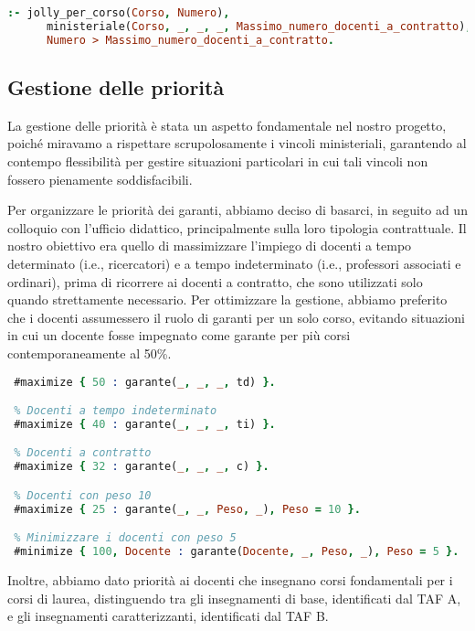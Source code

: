 \begin{lstlisting}[language=prolog, caption={Vincolo sul numero massimo di docenti a contratto.}]
 :- jolly_per_corso(Corso, Numero),
      ministeriale(Corso, _, _, _, Massimo_numero_docenti_a_contratto),
      Numero > Massimo_numero_docenti_a_contratto.
\end{lstlisting}





\subsection{Gestione delle priorità}\label{sec:priorita}
La gestione delle priorità è stata un aspetto fondamentale nel nostro progetto, poiché 
miravamo a rispettare scrupolosamente i vincoli ministeriali, garantendo al contempo 
flessibilità per gestire situazioni particolari in cui tali vincoli non fossero 
pienamente soddisfacibili.

Per organizzare le priorità dei garanti, abbiamo deciso di basarci, in seguito ad un 
colloquio con l'ufficio didattico, principalmente sulla loro tipologia contrattuale. 
Il nostro obiettivo era quello di massimizzare l'impiego di docenti a tempo determinato 
(i.e., ricercatori) e a tempo indeterminato (i.e., professori associati e ordinari), prima 
di ricorrere ai docenti a contratto, che sono utilizzati solo quando strettamente necessario. 
Per ottimizzare la gestione, abbiamo preferito che i docenti assumessero il ruolo di 
garanti per un solo corso, evitando situazioni in cui un docente fosse impegnato come 
garante per più corsi contemporaneamente al 50\%.

\begin{lstlisting}[language=prolog, caption=Gestione delle priorità dei docenti.]
 % Docenti a tempo determinato (ricercatori)
 #maximize { 50 : garante(_, _, _, td) }.

 % Docenti a tempo indeterminato
 #maximize { 40 : garante(_, _, _, ti) }.

 % Docenti a contratto
 #maximize { 32 : garante(_, _, _, c) }.

 % Docenti con peso 10
 #maximize { 25 : garante(_, _, Peso, _), Peso = 10 }.

 % Minimizzare i docenti con peso 5
 #minimize { 100, Docente : garante(Docente, _, Peso, _), Peso = 5 }.
\end{lstlisting}

Inoltre, abbiamo dato priorità ai docenti che insegnano corsi fondamentali per i 
corsi di laurea, distinguendo tra gli insegnamenti di base, identificati dal TAF A, 
e gli insegnamenti caratterizzanti, identificati dal TAF B.

